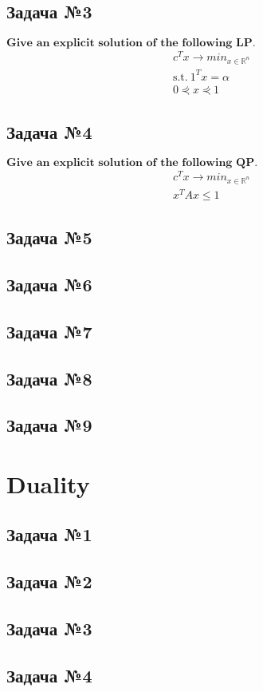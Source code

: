 \documentclass[12pt,letterpaper]{article}
\begin{document}
\subsection*{Задача №3}
$\textbf{Give an explicit solution of the following LP.}$
$$ 
\begin{aligned}
&c^Tx\rightarrow min_{x\in \mathbb{R}^n}\\ 
&\text{s.t.}\ 1^Tx=\alpha\\
&0\curlyeqprec x\curlyeqprec1
\end{aligned}
$$


\subsection*{Задача №4}
$\textbf{Give an explicit solution of the following QP.}$
$$ 
\begin{aligned}
&c^Tx\rightarrow min_{x\in \mathbb{R}^n}\\ 
&x^TAx\leqslant1
\end{aligned}
$$

\subsection*{Задача №5}
\subsection*{Задача №6}
\subsection*{Задача №7}
\subsection*{Задача №8}
\subsection*{Задача №9}

\section{Duality}
\subsection*{Задача №1}
\subsection*{Задача №2}
\subsection*{Задача №3}
\subsection*{Задача №4}
\end{document}
